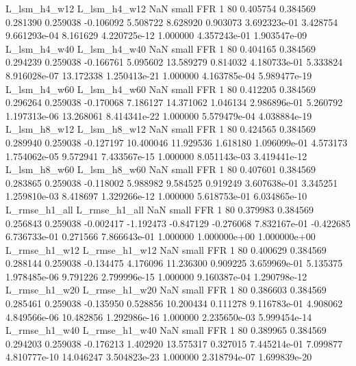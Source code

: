   L_lsm_h4_w12   L_lsm_h4_w12                   NaN      small      FFR                 1 80 0.405754       0.384569 0.281390       0.259038   -0.106092      5.508722      8.628920     0.903073   3.692323e-01  3.428754 9.661293e-04     8.161629   4.220725e-12            1.000000    4.357243e-01        1.903547e-09
  L_lsm_h4_w40   L_lsm_h4_w40                   NaN      small      FFR                 1 80 0.404165       0.384569 0.294239       0.259038   -0.166761      5.095602     13.589279     0.814032   4.180733e-01  5.333824 8.916028e-07    13.172338   1.250413e-21            1.000000    4.163785e-04        5.989477e-19
  L_lsm_h4_w60   L_lsm_h4_w60                   NaN      small      FFR                 1 80 0.412205       0.384569 0.296264       0.259038   -0.170068      7.186127     14.371062     1.046134   2.986896e-01  5.260792 1.197313e-06    13.268061   8.414341e-22            1.000000    5.579479e-04        4.038884e-19
  L_lsm_h8_w12   L_lsm_h8_w12                   NaN      small      FFR                 1 80 0.424565       0.384569 0.289940       0.259038   -0.127197     10.400046     11.929536     1.618180   1.096099e-01  4.573173 1.754062e-05     9.572941   7.433567e-15            1.000000    8.051143e-03        3.419441e-12
  L_lsm_h8_w60   L_lsm_h8_w60                   NaN      small      FFR                 1 80 0.407601       0.384569 0.283865       0.259038   -0.118002      5.988982      9.584525     0.919249   3.607638e-01  3.345251 1.259810e-03     8.418697   1.329266e-12            1.000000    5.618753e-01        6.034865e-10
 L_rmse_h1_all  L_rmse_h1_all                   NaN      small      FFR                 1 80 0.379983       0.384569 0.256843       0.259038   -0.002417     -1.192473     -0.847129    -0.276068   7.832167e-01 -0.422685 6.736733e-01     0.271566   7.866643e-01            1.000000    1.000000e+00        1.000000e+00
 L_rmse_h1_w12  L_rmse_h1_w12                   NaN      small      FFR                 1 80 0.400629       0.384569 0.288144       0.259038   -0.134475      4.176096     11.236300     0.909225   3.659969e-01  5.135375 1.978485e-06     9.791226   2.799996e-15            1.000000    9.160387e-04        1.290798e-12
 L_rmse_h1_w20  L_rmse_h1_w20                   NaN      small      FFR                 1 80 0.386603       0.384569 0.285461       0.259038   -0.135950      0.528856     10.200434     0.111278   9.116783e-01  4.908062 4.849566e-06    10.482856   1.292986e-16            1.000000    2.235650e-03        5.999454e-14
 L_rmse_h1_w40  L_rmse_h1_w40                   NaN      small      FFR                 1 80 0.389965       0.384569 0.294203       0.259038   -0.176213      1.402920     13.575317     0.327015   7.445214e-01  7.099877 4.810777e-10    14.046247   3.504823e-23            1.000000    2.318794e-07        1.699839e-20

